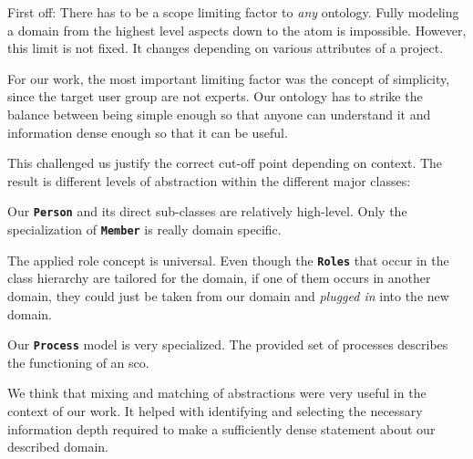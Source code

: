 \documentclass[a4paper, DIV=13, BCOR=0cm]{scrbook}
\newcommand{\class}[1]{\texttt{\textbf{#1}}}
\begin{document}
First off: There has to be a scope limiting factor to \textit{any} ontology. Fully modeling a domain from the highest level aspects down to the atom is impossible. However, this limit is not fixed. It changes depending on various attributes of a project.

For our work, the most important limiting factor was the concept of simplicity, since the target user group are not experts. Our ontology has to strike the balance between being simple enough so that anyone can understand it and information dense enough so that it can be useful.

This challenged us justify the correct cut-off point depending on context. The result is different levels of abstraction within the different major classes: 
\begin{inparaenum}
	\item Our \class{Person} and its direct sub-classes are relatively high-level. Only the specialization of \class{Member} is really domain specific. 
	\item The applied role concept is universal. Even though the \class{Roles} that occur in the class hierarchy are tailored for the domain, if one of them occurs in another domain, they could just be taken from our domain and \textit{plugged in} into the new domain.
	\item Our \class{Process} model is very specialized. The provided set of processes describes the functioning of an \gls{sco}.
\end{inparaenum}

We think that mixing and matching of abstractions were very useful in the context of our work. It helped with identifying and selecting the necessary information depth required to make a sufficiently dense statement about our described domain.
\end{document}
